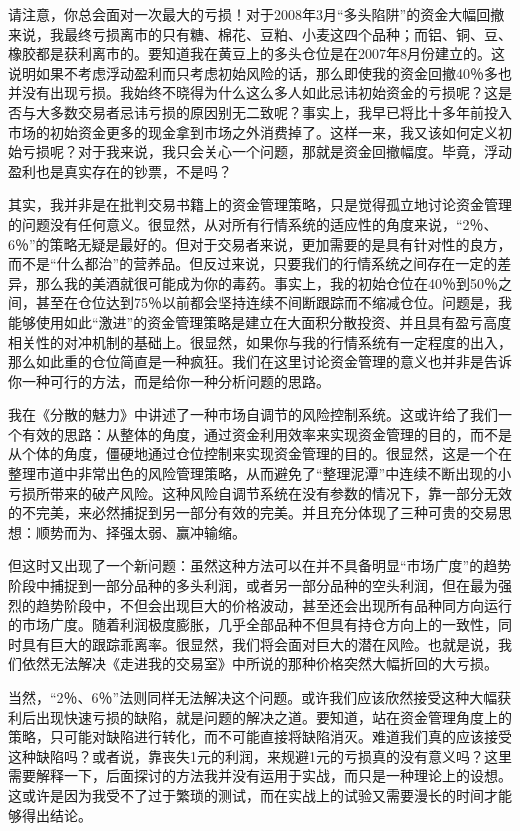 请注意，你总会面对一次最大的亏损！对于2008年3月“多头陷阱”的资金大幅回撤来说，我最终亏损离市的只有糖、棉花、豆粕、小麦这四个品种；而铝、铜、豆、橡胶都是获利离市的。要知道我在黄豆上的多头仓位是在2007年8月份建立的。这说明如果不考虑浮动盈利而只考虑初始风险的话，那么即使我的资金回撤40％多也并没有出现亏损。我始终不晓得为什么这么多人如此忌讳初始资金的亏损呢？这是否与大多数交易者忌讳亏损的原因别无二致呢？事实上，我早已将比十多年前投入市场的初始资金更多的现金拿到市场之外消费掉了。这样一来，我又该如何定义初始亏损呢？对于我来说，我只会关心一个问题，那就是资金回撤幅度。毕竟，浮动盈利也是真实存在的钞票，不是吗？

其实，我并非是在批判交易书籍上的资金管理策略，只是觉得孤立地讨论资金管理的问题没有任何意义。很显然，从对所有行情系统的适应性的角度来说，“2％、6％”的策略无疑是最好的。但对于交易者来说，更加需要的是具有针对性的良方，而不是“什么都治”的营养品。但反过来说，只要我们的行情系统之间存在一定的差异，那么我的美酒就很可能成为你的毒药。事实上，我的初始仓位在40％到50％之间，甚至在仓位达到75％以前都会坚持连续不间断跟踪而不缩减仓位。问题是，我能够使用如此“激进”的资金管理策略是建立在大面积分散投资、并且具有盈亏高度相关性的对冲机制的基础上。很显然，如果你与我的行情系统有一定程度的出入，那么如此重的仓位简直是一种疯狂。我们在这里讨论资金管理的意义也并非是告诉你一种可行的方法，而是给你一种分析问题的思路。

我在《分散的魅力》中讲述了一种市场自调节的风险控制系统。这或许给了我们一个有效的思路：从整体的角度，通过资金利用效率来实现资金管理的目的，而不是从个体的角度，僵硬地通过仓位控制来实现资金管理的目的。很显然，这是一个在整理市道中非常出色的风险管理策略，从而避免了“整理泥潭”中连续不断出现的小亏损所带来的破产风险。这种风险自调节系统在没有参数的情况下，靠一部分无效的不完美，来必然捕捉到另一部分有效的完美。并且充分体现了三种可贵的交易思想：顺势而为、择强太弱、赢冲输缩。

但这时又出现了一个新问题：虽然这种方法可以在并不具备明显“市场广度”的趋势阶段中捕捉到一部分品种的多头利润，或者另一部分品种的空头利润，但在最为强烈的趋势阶段中，不但会出现巨大的价格波动，甚至还会出现所有品种同方向运行的市场广度。随着利润极度膨胀，几乎全部品种不但具有持仓方向上的一致性，同时具有巨大的跟踪乖离率。很显然，我们将会面对巨大的潜在风险。也就是说，我们依然无法解决《走进我的交易室》中所说的那种价格突然大幅折回的大亏损。

当然，“2％、6％”法则同样无法解决这个问题。或许我们应该欣然接受这种大幅获利后出现快速亏损的缺陷，就是问题的解决之道。要知道，站在资金管理角度上的策略，只可能对缺陷进行转化，而不可能直接将缺陷消灭。难道我们真的应该接受这种缺陷吗？或者说，靠丧失1元的利润，来规避1元的亏损真的没有意义吗？这里需要解释一下，后面探讨的方法我并没有运用于实战，而只是一种理论上的设想。这或许是因为我受不了过于繁琐的测试，而在实战上的试验又需要漫长的时间才能够得出结论。

